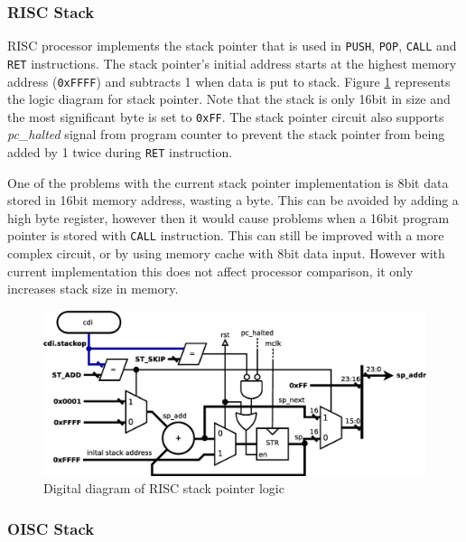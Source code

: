 \subsubsection{RISC Stack}
RISC processor implements the stack pointer that is used in \texttt{PUSH}, \texttt{POP}, \texttt{CALL} and \texttt{RET} instructions. The stack pointer's initial address starts at the highest memory address (\texttt{0xFFFF}) and subtracts 1 when data is put to stack. Figure \ref{fig:risc_stack} represents the logic diagram for stack pointer. Note that the stack is only 16bit in size and the most significant byte is set to \texttt{0xFF}. The stack pointer circuit also supports \textit{pc\_halted} signal from program counter to prevent the stack pointer from being added by 1 twice during \texttt{RET} instruction. 

One of the problems with the current stack pointer implementation is 8bit data stored in 16bit memory address, wasting a byte. This can be avoided by adding a high byte register, however then it would cause problems when a 16bit program pointer is stored with \texttt{CALL} instruction. This can still be improved with a more complex circuit, or by using memory cache with 8bit data input. However with current implementation this does not affect processor comparison, it only increases stack size in memory.

\begin{figure}
	\centering
	\includegraphics[scale=0.4]{../resources/risc_stack.eps}
	\caption{Digital diagram of RISC stack pointer logic}
	\label{fig:risc_stack}
\end{figure}

\subsubsection{OISC Stack}

